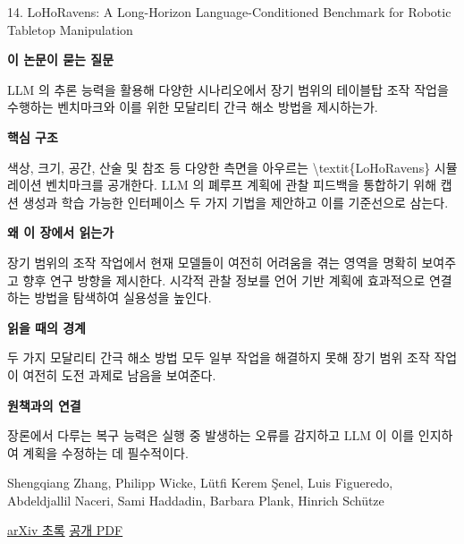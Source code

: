 \documentclass[11pt,openany]{book}
\begin{document}
\begin{termcard}{14. LoHoRavens: A Long-Horizon Language-Conditioned Benchmark for Robotic Tabletop Manipulation}

\par

\medskip

{\sffamily\bfseries\color{deepblue} 이 논문이 묻는 질문}\par

LLM 의 추론 능력을 활용해 다양한 시나리오에서 장기 범위의 테이블탑 조작 작업을 수행하는 벤치마크와 이를 위한 모달리티 간극 해소 방법을 제시하는가.

\smallskip

{\sffamily\bfseries\color{deepblue} 핵심 구조}\par

색상, 크기, 공간, 산술 및 참조 등 다양한 측면을 아우르는 \textbackslash{}textit\{LoHoRavens\} 시뮬레이션 벤치마크를 공개한다. LLM 의 폐루프 계획에 관찰 피드백을 통합하기 위해 캡션 생성과 학습 가능한 인터페이스 두 가지 기법을 제안하고 이를 기준선으로 삼는다.

\smallskip

{\sffamily\bfseries\color{deepblue} 왜 이 장에서 읽는가}\par

장기 범위의 조작 작업에서 현재 모델들이 여전히 어려움을 겪는 영역을 명확히 보여주고 향후 연구 방향을 제시한다. 시각적 관찰 정보를 언어 기반 계획에 효과적으로 연결하는 방법을 탐색하여 실용성을 높인다.

\smallskip

{\sffamily\bfseries\color{coral} 읽을 때의 경계}\par

두 가지 모달리티 간극 해소 방법 모두 일부 작업을 해결하지 못해 장기 범위 조작 작업이 여전히 도전 과제로 남음을 보여준다.

\smallskip

{\sffamily\bfseries\color{teal} 원책과의 연결}\par

장론에서 다루는 복구 능력은 실행 중 발생하는 오류를 감지하고 LLM 이 이를 인지하여 계획을 수정하는 데 필수적이다.

\medskip

{\footnotesize\color{muted} Shengqiang Zhang, Philipp Wicke, Lütfi Kerem Şenel, Luis Figueredo, Abdeldjallil Naceri, Sami Haddadin, Barbara Plank, Hinrich Schütze\par

\href{https://arxiv.org/abs/2310.12020}{arXiv 초록} \quad \href{https://arxiv.org/pdf/2310.12020}{공개 PDF}\par}

\end{termcard}
\end{document}
